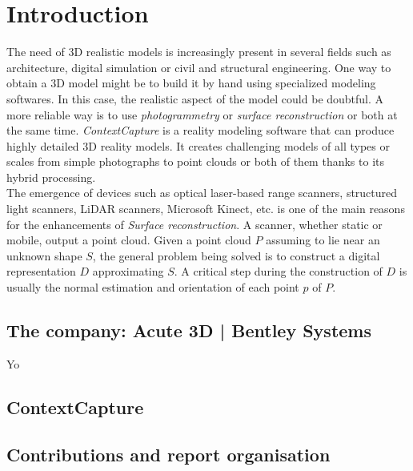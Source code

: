 \chapter{Introduction}
\label{ch:introduction}

The need of 3D realistic models is increasingly present in several fields such as architecture, digital simulation or civil and structural engineering. One way to obtain a 3D model might be to build it by hand using specialized modeling softwares. In this case, the realistic aspect of the model could be doubtful. A more reliable way is to use \emph{photogrammetry} or \emph{surface reconstruction} or both at the same time.
\emph{ContextCapture} is a reality modeling software that can produce highly detailed 3D reality models. It creates challenging models of all types or scales from simple photographs to point clouds or both of them thanks to its hybrid processing.\\
The emergence of devices such as optical laser-based range scanners, structured light scanners, LiDAR scanners, Microsoft Kinect, etc. is one of the main reasons for the enhancements of \emph{Surface reconstruction}. A scanner, whether static or mobile, output a point cloud. Given a point cloud $P$ assuming to lie near an unknown shape $S$, the general problem being solved is to construct a digital representation $D$ approximating $S$. A critical step during the construction of $D$ is usually the normal estimation and orientation of each point $p$ of $P$.



\section{The company: Acute 3D | Bentley Systems}
Yo \cite{15}


\section{ContextCapture}


\section{Contributions and report organisation}
